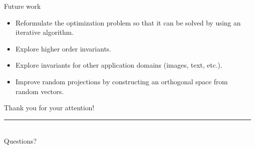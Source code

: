 \documentclass[10pt, dvipsnames]{beamer}
\begin{document}
\begin{frame}{Future work}
    \begin{itemize}
        \item<1-> Reformulate the optimization problem so that it can be solved by using an iterative
        algorithm.
        \item<2-> Explore higher order invariants.
        \item<3-> Explore invariants for other application domains (images, text, etc.).
        \item<4-> Improve random projections by constructing an orthogonal space from random vectors.
    \end{itemize}
\end{frame}

\begin{frame}[standout]
    Thank you for your attention!
    \rule[-1ex]{\textwidth}{1.5pt}\\[3.5ex]
    Questions?
\end{frame}
\end{document}

